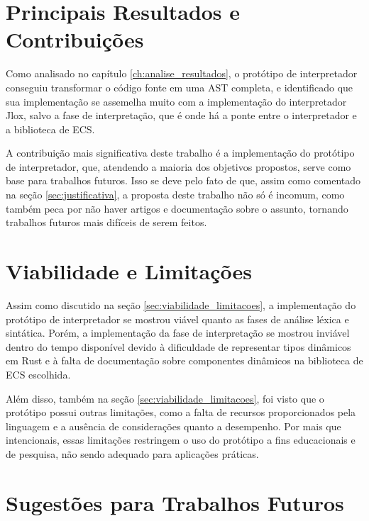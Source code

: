 \section{Principais Resultados e Contribuições}

Como analisado no capítulo \ref{ch:analise_resultados}, o protótipo de interpretador conseguiu transformar o código fonte em uma AST completa, e identificado que sua implementação se assemelha muito com a implementação do interpretador Jlox, salvo a fase de interpretação, que é onde há a ponte entre o interpretador e a biblioteca de ECS.

A contribuição mais significativa deste trabalho é a implementação do protótipo de interpretador, que, atendendo a maioria dos objetivos propostos, serve como base para trabalhos futuros. Isso se deve pelo fato de que, assim como comentado na seção \ref{sec:justificativa}, a proposta deste trabalho não só é incomum, como também peca por não haver artigos e documentação sobre o assunto, tornando trabalhos futuros mais difíceis de serem feitos.

\section{Viabilidade e Limitações}

Assim como discutido na seção \ref{sec:viabilidade_limitacoes}, a implementação do protótipo de interpretador se mostrou viável quanto as fases de análise léxica e sintática. Porém, a implementação da fase de interpretação se mostrou inviável dentro do tempo disponível devido à dificuldade de representar tipos dinâmicos em
Rust e à falta de documentação sobre componentes dinâmicos na biblioteca de ECS escolhida.

Além disso, também na seção \ref{sec:viabilidade_limitacoes}, foi visto que o protótipo possui outras limitações, como a falta de recursos proporcionados pela linguagem e a ausência de considerações quanto a desempenho. Por mais que intencionais, essas limitações restringem o uso do protótipo a fins educacionais e de pesquisa, não sendo adequado para aplicações práticas.

\section{Sugestões para Trabalhos Futuros}


